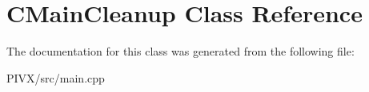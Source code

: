 \hypertarget{class_c_main_cleanup}{}\section{C\+Main\+Cleanup Class Reference}
\label{class_c_main_cleanup}


The documentation for this class was generated from the following file\+:\begin{DoxyCompactItemize}
\item 
P\+I\+V\+X/src/main.\+cpp\end{DoxyCompactItemize}
